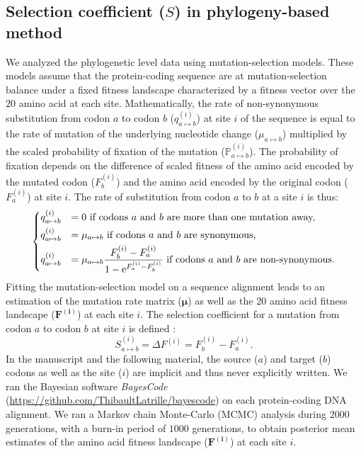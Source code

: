 \documentclass{article}
\newcommand{\UniDimArray}[1]{\bm{#1}}
\newcommand{\e}{\textrm{e}}
\newcommand{\proba}{\mathbb{P}}
\newcommand{\Sphy}{S}
\begin{document}
    \subsection{Selection coefficient ($\Sphy$) in phylogeny-based method}
    \label{subsec:s-phylogeny-method}

    We analyzed the phylogenetic level data using mutation-selection models.
    These models assume that the protein-coding sequence are at mutation-selection balance under a fixed fitness landscape characterized by a fitness vector over the $20$ amino acid at each site\cite{yang_mutationselection_2008, halpern_evolutionary_1998, rodrigue_mechanistic_2010}.
    Mathematically, the rate of non-synonymous substitution from codon $a$ to codon $b$ ($q_{a \mapsto b}^{(i)}$) at site $i$ of the sequence is equal to the rate of mutation of the underlying nucleotide change ($\mu_{a \mapsto b}$) multiplied by the scaled probability of fixation of the mutation ($\proba_{a \mapsto b}^{(i)}$).
    The probability of fixation depends on the difference of scaled fitness of the amino acid encoded by the mutated codon ($F_b^{(i)}$) and the amino acid encoded by the original codon ($F_a^{(i)}$) at site $i$\cite{wright_evolution_1931, fisher_genetical_1930}.
    The rate of substitution from codon $a$ to $b$ at a site $i$ is thus:
    \begin{equation}
        \begin{dcases}
            q_{a \mapsto b}^{(i)} & = 0 \text{ if codons $a$ and $b$ are more than one mutation away,} \\
            q_{a \mapsto b}^{(i)} & = \mu_{a \mapsto b} \text{ if codons $a$ and $b$ are synonymous,} \\
            q_{a \mapsto b}^{(i)} & = \mu_{a \mapsto b} \dfrac{F_b^{(i)} - F_a^{(i)}}{1 - \e^{F_a^{(i)} - F_b^{(i)}}} \text{ if codons $a$ and $b$ are non-synonymous}.
        \end{dcases}
    \end{equation}
    Fitting the mutation-selection model on a sequence alignment leads to an estimation of the mutation rate matrix ($\UniDimArray{\mu}$) as well as the 20 amino acid fitness landscape ($\UniDimArray{F^{(i)}}$) at each site $i$.
    The selection coefficient for a mutation from codon $a$ to codon $b$ at site $i$ is defined :
    \begin{equation}
        S_{a \mapsto b}^{(i)} = \Delta F^{(i)} = F^{(i)}_{b} - F^{(i)}_{a}.
    \end{equation}
    In the manuscript and the following material, the source ($a$) and target ($b$) codons as well as the site ($i$) are implicit and thus never explicitly written.
    We ran the Bayesian software \textit{BayesCode} (\url{https://github.com/ThibaultLatrille/bayescode}) on each protein-coding DNA alignment\cite{rodrigue_bayesian_2021}.
    We ran a Markov chain Monte-Carlo (MCMC) analysis during $2000$ generations, with a burn-in period of $1000$ generations, to obtain posterior mean estimates of the amino acid fitness landscape ($\UniDimArray{F^{(i)}}$) at each site $i$\@.
\end{document}

